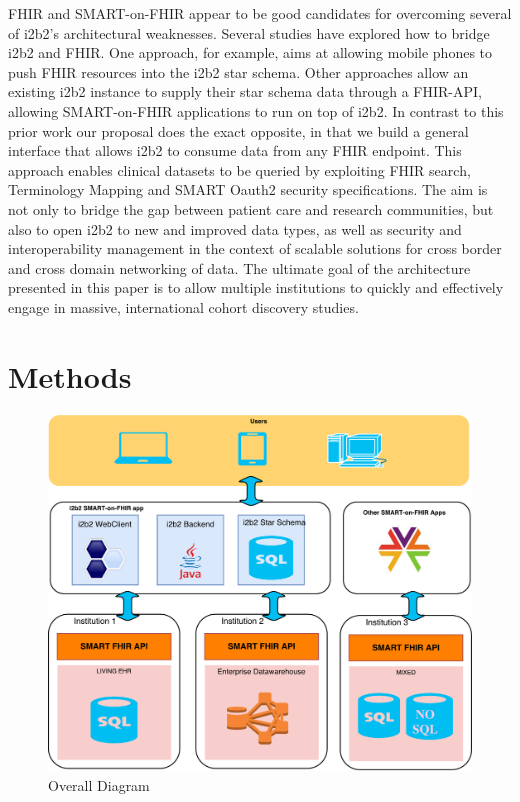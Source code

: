 \documentclass{amia}
\newcommand{\remXavier}[1]{\todo[color=yellow]{[XT]{\scriptsize #1\par}}}
\newcommand{\remNico}[1]{\todo[color=orange]{[NP]{\scriptsize #1\par}}}
\begin{document}
FHIR and SMART-on-FHIR appear to be good candidates for overcoming several of i2b2's architectural weaknesses. Several studies have explored how to bridge i2b2 and FHIR. One approach\cite{Pfiffner__2016}, for example, aims at allowing mobile phones to push FHIR resources into the i2b2 star schema. Other approaches \cite{Wagholikar_2016,Boussadi_Zapletal_2017} allow an existing i2b2 instance to supply their star schema data through a FHIR-API, allowing SMART-on-FHIR applications to run on top of i2b2. In contrast to this prior work our proposal does the exact opposite, in that we build a general interface that allows i2b2 to consume data from any FHIR endpoint. This approach enables clinical datasets to be queried by exploiting FHIR search, Terminology Mapping\cite{FHIR} and SMART Oauth2 security\cite{SMARTFHIR} specifications. The aim is not only to bridge the gap between patient care and research communities, but also to open i2b2 to new and improved data types, as well as security and interoperability management in the context of scalable solutions for cross border and cross domain networking of data. The ultimate goal of the architecture presented in this paper is to allow multiple institutions to quickly and effectively engage in massive, international cohort discovery studies.

\section*{Methods}
\begin{figure}[h]
\centering
\includegraphics[width=.8\linewidth]{overall.pdf}
	\caption{Overall Diagram}
\label{overall}
\end{figure}
\end{document}
